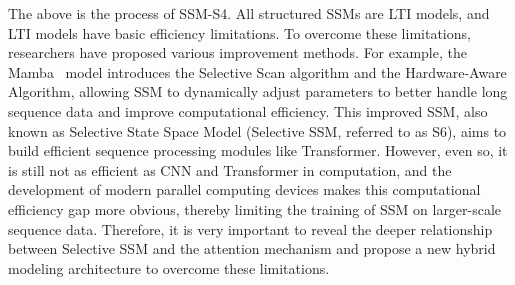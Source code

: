 \documentclass{article}
\theoremstyle{plain}
\theoremstyle{definition}
\theoremstyle{remark}
\begin{document}


 The above is the process of SSM-S4. All structured SSMs are LTI models, and LTI models have basic efficiency limitations. To overcome these limitations, researchers have proposed various improvement methods. For example, the Mamba~\cite{mamba2} model introduces the Selective Scan algorithm and the Hardware-Aware Algorithm, allowing SSM to dynamically adjust parameters to better handle long sequence data and improve computational efficiency. This improved SSM, also known as Selective State Space Model (Selective SSM, referred to as S6), aims to build efficient sequence processing modules like Transformer. However, even so, it is still not as efficient as CNN and Transformer in computation, and the development of modern parallel computing devices makes this computational efficiency gap more obvious, thereby limiting the training of SSM on larger-scale sequence data. Therefore, it is very important to reveal the deeper relationship between Selective SSM and the attention mechanism and propose a new hybrid modeling architecture to overcome these limitations.
\end{document}
